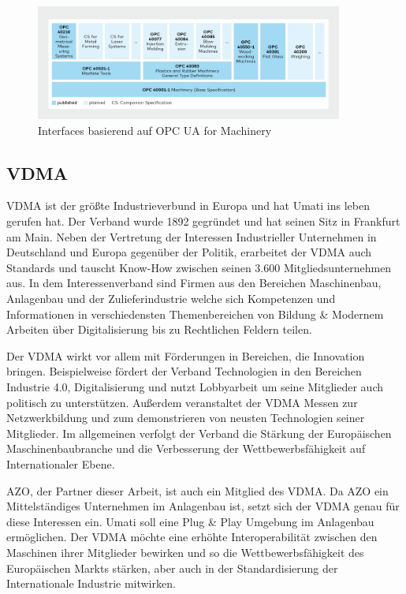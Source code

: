\documentclass[a4paper, 12pt, oneside]{scrbook}
\begin{document}
		\begin{figure}[H]
			\centering
			\includegraphics[width=0.9\textwidth]{res/diagramms/OPCUA_for_machinery.png}
			\caption{Interfaces basierend auf OPC UA for Machinery \cite{noauthor_machinery_nodate}} 
			\label{fig:OPCUA_for_machinery}
		\end{figure}
		
		
		
	
		\subsection{VDMA}
		
		\ac{VDMA} ist der größte Industrieverbund in Europa und hat Umati ins leben gerufen hat. Der Verband wurde 1892 gegründet und hat seinen Sitz in Frankfurt am Main. Neben der Vertretung der Interessen Industrieller Unternehmen in Deutschland und Europa gegenüber der Politik, erarbeitet der VDMA auch Standards und tauscht Know-How zwischen seinen 3.600 Mitgliedsunternehmen aus. \cite{noauthor_verband_nodate} In dem Interessenverband sind Firmen aus den Bereichen Maschinenbau, Anlagenbau und der Zulieferindustrie welche sich Kompetenzen und Informationen in verschiedensten Themenbereichen von Bildung \& Modernem Arbeiten über Digitalisierung bis zu Rechtlichen Feldern teilen. \cite{noauthor_themenubersicht_nodate}
		
		Der VDMA wirkt vor allem mit Förderungen in Bereichen, die Innovation bringen. Beispielweise fördert der Verband Technologien in den Bereichen Industrie 4.0, Digitalisierung und nutzt Lobbyarbeit um seine Mitglieder auch politisch zu unterstützen. Außerdem veranstaltet der VDMA Messen zur Netzwerkbildung und zum demonstrieren von neusten Technologien seiner Mitglieder. Im allgemeinen verfolgt der Verband die Stärkung der Europäischen Maschinenbaubranche und die Verbesserung der Wettbewerbsfähigkeit auf Internationaler Ebene.
		
		AZO, der Partner dieser Arbeit, ist auch ein Mitglied des VDMA. Da AZO ein Mittelständiges Unternehmen im Anlagenbau ist, setzt sich der VDMA genau für diese Interessen ein. Umati soll eine Plug \& Play Umgebung im Anlagenbau ermöglichen. Der VDMA möchte eine erhöhte Interoperabilität zwischen den Maschinen ihrer Mitglieder bewirken und so die Wettbewerbsfähigkeit des Europäischen Markts stärken, aber auch in der Standardisierung der Internationale Industrie mitwirken. 
		
\end{document}
